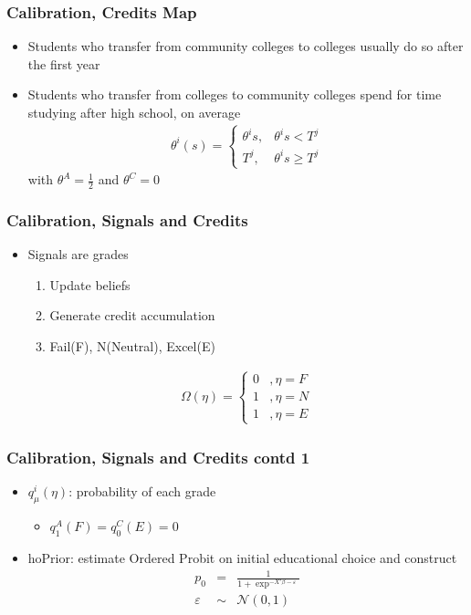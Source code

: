 \begin{frame}
	\frametitle{Calibration, Credits Map}
		\begin{itemize}
		\item Students who transfer from community colleges to colleges usually do so after the first year
		\item Students who transfer from colleges to community colleges spend for time studying after high school, on average
			\begin{eqnarray}
				\theta^i(s) =
				\begin{cases}
					\theta^i s ,& \theta^i s < T^j \\
					T^j        ,& \theta^i s \geq T^j
				\end{cases}
			\end{eqnarray}
\noindent with $\theta^A = \frac{1}{2}$ and $\theta^C = 0$
		\end{itemize}
\end{frame}

\begin{frame}
	\frametitle{Calibration, Signals and Credits}
		\begin{itemize}
		\item Signals are grades
			\begin{enumerate}
				\item Update beliefs
				\item Generate credit accumulation
				\item Fail(F), N(Neutral), Excel(E)
			\end{enumerate}
		\begin{eqnarray}
			\Omega(\eta) =
				\begin{cases}
					0 &, \eta = F \\
					1 &, \eta = N \\
					1 &, \eta = E
				\end{cases}
		\end{eqnarray}			
	\end{itemize}		
\end{frame}

\begin{frame}
	\frametitle{Calibration, Signals and Credits contd 1}
		\begin{itemize}
			\item $q_{\mu}^i(\eta)$: probability of each grade
				\begin{itemize}
					\item $q_{1}^A(F) = q_{0}^C(E) = 0$	
				\end{itemize}	
			\item hoPrior: estimate Ordered Probit on initial educational choice and construct
				\begin{eqnarray}
				p_{0} &=& \frac{1}{1 + \exp^{- X'\beta - \varepsilon}} \nonumber \\
				\varepsilon &\sim& \mathcal{N}(0,1) 
				\end{eqnarray}						 
		\end{itemize}
\end{frame}

